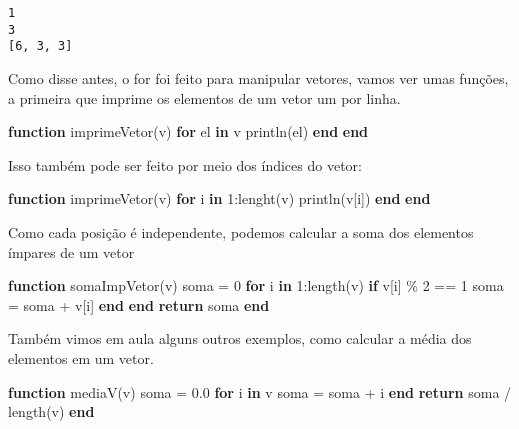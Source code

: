 \documentclass[
  letterpaper,
  DIV=11,
  numbers=noendperiod]{scrreprt}
\newenvironment{Shaded}{\begin{snugshade}}{\end{snugshade}}
\newcommand{\ControlFlowTok}[1]{\textcolor[rgb]{0.00,0.23,0.31}{\textbf{#1}}}
\newcommand{\FloatTok}[1]{\textcolor[rgb]{0.68,0.00,0.00}{#1}}
\newcommand{\FunctionTok}[1]{\textcolor[rgb]{0.28,0.35,0.67}{#1}}
\newcommand{\KeywordTok}[1]{\textcolor[rgb]{0.00,0.23,0.31}{\textbf{#1}}}
\newcommand{\NormalTok}[1]{\textcolor[rgb]{0.00,0.23,0.31}{#1}}
\newcommand{\OperatorTok}[1]{\textcolor[rgb]{0.37,0.37,0.37}{#1}}
\begin{document}
\begin{verbatim}
1
3
[6, 3, 3]
\end{verbatim}

Como disse antes, o for foi feito para manipular vetores, vamos ver umas
funções, a primeira que imprime os elementos de um vetor um por linha.

\begin{Shaded}
\begin{Highlighting}[]
\KeywordTok{function} \FunctionTok{imprimeVetor}\NormalTok{(v)}
    \ControlFlowTok{for}\NormalTok{ el }\KeywordTok{in}\NormalTok{ v}
        \FunctionTok{println}\NormalTok{(el)}
    \ControlFlowTok{end}
\KeywordTok{end}
\end{Highlighting}
\end{Shaded}

Isso também pode ser feito por meio dos índices do vetor:

\begin{Shaded}
\begin{Highlighting}[]
\KeywordTok{function} \FunctionTok{imprimeVetor}\NormalTok{(v)}
    \ControlFlowTok{for}\NormalTok{ i }\KeywordTok{in} \FloatTok{1}\OperatorTok{:}\FunctionTok{lenght}\NormalTok{(v)}
        \FunctionTok{println}\NormalTok{(v[i])}
    \ControlFlowTok{end}
\KeywordTok{end}
\end{Highlighting}
\end{Shaded}

Como cada posição é independente, podemos calcular a soma dos elementos
ímpares de um vetor

\begin{Shaded}
\begin{Highlighting}[]
\KeywordTok{function} \FunctionTok{somaImpVetor}\NormalTok{(v)}
\NormalTok{    soma }\OperatorTok{=} \FloatTok{0}
    \ControlFlowTok{for}\NormalTok{ i }\KeywordTok{in} \FloatTok{1}\OperatorTok{:}\FunctionTok{length}\NormalTok{(v)}
        \ControlFlowTok{if}\NormalTok{ v[i] }\OperatorTok{\%} \FloatTok{2} \OperatorTok{==} \FloatTok{1}
\NormalTok{            soma }\OperatorTok{=}\NormalTok{ soma }\OperatorTok{+}\NormalTok{ v[i]}
        \ControlFlowTok{end}
    \ControlFlowTok{end}
    \ControlFlowTok{return}\NormalTok{ soma}
\KeywordTok{end}
\end{Highlighting}
\end{Shaded}

Também vimos em aula alguns outros exemplos, como calcular a média dos
elementos em um vetor.

\begin{Shaded}
\begin{Highlighting}[]
\KeywordTok{function} \FunctionTok{mediaV}\NormalTok{(v)}
\NormalTok{   soma }\OperatorTok{=} \FloatTok{0.0}
   \ControlFlowTok{for}\NormalTok{ i }\KeywordTok{in}\NormalTok{ v}
\NormalTok{      soma }\OperatorTok{=}\NormalTok{ soma }\OperatorTok{+}\NormalTok{ i}
   \ControlFlowTok{end}
   \ControlFlowTok{return}\NormalTok{ soma }\OperatorTok{/} \FunctionTok{length}\NormalTok{(v)}
\KeywordTok{end}
\end{Highlighting}
\end{Shaded}
\end{document}
